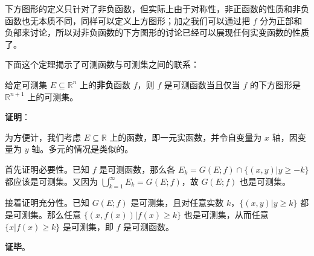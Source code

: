 下方图形的定义只针对了非负函数，但实际上由于对称性，非正函数的性质和非负函数也无本质不同，同样可以定义上方图形；加之我们可以通过把 $f$ 分为正部和负部来讨论，所以对非负函数的下方图形的讨论已经可以展现任何实变函数的性质了。

下面这个定理揭示了可测函数与可测集之间的联系：

\begin{theorem}{}\label{MsbFun_the4}

给定可测集 $E\subseteq\mathbb{R}^n$ 上的\textbf{非负}函数 $f$，则 $f$ 是可测函数当且仅当 $f$ 的下方图形是 $\mathbb{R}^{n+1}$ 上的可测集。

\end{theorem}

\textbf{证明}：

为方便计，我们考虑 $E\subseteq\mathbb{R}$ 上的函数，即一元实函数，并令自变量为 $x$ 轴，因变量为 $y$ 轴。多元的情况是类似的。

首先证明必要性。已知 $f$ 是可测函数，那么各 $E_k=G(E; f)\cap\{(x, y)|y\geq -k\}$ 都应该是可测集。又因为 $\bigcup^\infty_{k=1} E_k=G(E; f)$，故 $G(E; f)$ 也是可测集。

接着证明充分性。已知 $G(E; f)$ 是可测集，且对任意实数 $k$，$\{(x, y)|y\geq k\}$ 都是可测集。那么任意 $\{(x, f(x))|f(x)\geq k\}$ 也是可测集，从而任意 $\{x|f(x)\geq k\}$ 是可测集，即 $f$ 是可测函数。

\textbf{证毕}。



